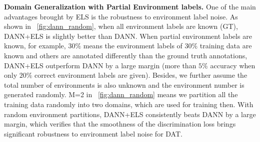 \documentclass{article} \usepackage{iclr2023_conference,times}
\newcommand{\abbr}[0]{DANN+ELS\xspace}
\newcommand{\ls}[0]{ELS\xspace}
\begin{document}
\textbf{Domain Generalization with Partial Environment labels.} One of the main advantages brought by \ls is the robustness to environment label noise. As shown in \figurename~\ref{fig:dann_random}, when all environment labels are known (GT), \abbr is slightly better than DANN. When partial environment labels are known, for example, $30\%$ means the environment labels of $30\%$ training data are known and others are annotated differently than the ground truth annotations, \abbr outperform DANN by a large margin (more than $5\%$ accuracy when only $20\%$ correct environment labels are given). Besides, we further assume the total number of environments is also unknown and the environment number is generated randomly. M=2 in \figurename~\ref{fig:dann_random} means we partition all the training data randomly into two domains, which are used for training then. With random environment partitions, \abbr consistently beats DANN by a large margin, which verifies that the smoothness of the discrimination loss brings significant robustness to environment label noise for DAT. 
\end{document}
